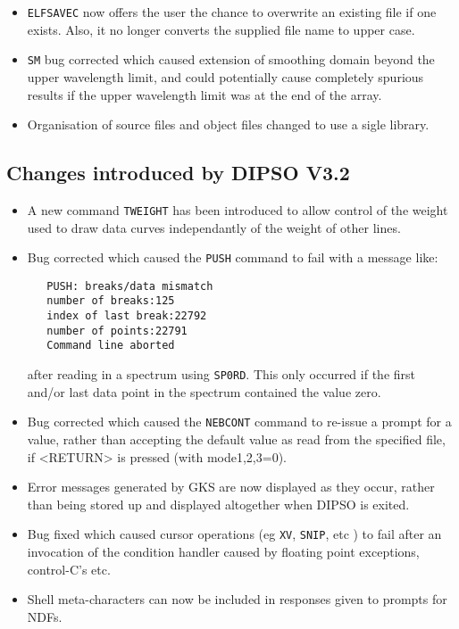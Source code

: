 \documentclass[twoside,11pt]{article}
\newcommand{\htmlref}[2]{#1}
\renewcommand{\_}{\texttt{\symbol{95}}}
\begin{document}
\begin{itemize}
\item {\tt ELFSAVEC} now offers the user the chance to overwrite an
existing file if one exists. Also, it no longer converts the
supplied file name to upper case.

\item {\tt SM} bug corrected which caused extension of smoothing domain
beyond the upper wavelength limit, and could potentially cause
completely spurious results if the upper wavelength limit was
at the end of the array.

\item Organisation of source files and object files changed to use a
sigle library.

\end{itemize}

\subsection{Changes introduced by DIPSO V3.2}
\begin{itemize}
\item A new command \htmlref{{\tt{TWEIGHT}}}{COM:TWEIGHT}  has been introduced to allow control of the
weight used to draw data curves independantly of the weight of other
lines.

\item Bug corrected which caused the \htmlref{{\tt{PUSH}}}{COM:PUSH}  command to fail with a message
like:

\begin{verbatim}
   PUSH: breaks/data mismatch
   number of breaks:125
   index of last break:22792
   number of points:22791
   Command line aborted
\end{verbatim}

after reading in a spectrum using \htmlref{{\tt{SP0RD}}}{COM:SP0RD}. This
only occurred if the first and/or last data point in the spectrum
contained the value zero.

\item Bug corrected which caused the \htmlref{{\tt{NEBCONT}}}{COM:NEBCONT}  command to re-issue a prompt
for a value, rather than accepting the default value as read from the
specified file, if <RETURN> is pressed (with mode1,2,3=0).

\item Error messages generated by GKS are now displayed as they occur,
rather than being stored up and displayed altogether when DIPSO is
exited.

\item Bug fixed which caused cursor operations (eg \htmlref{{\tt{XV}}}{COM:XV},  \htmlref{{\tt{SNIP}}}{COM:SNIP},  etc ) to
fail after an invocation of the condition handler caused by floating
point exceptions, control-C's etc.

\item Shell meta-characters can now be included in responses given to
prompts for NDFs.

\end{itemize}
\end{document}
